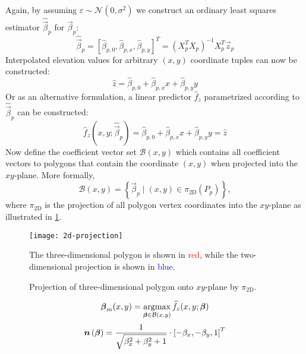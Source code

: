 %
Again, by assuming $\varepsilon \sim \mathcal{N}(0, \sigma^2)$ we construct an ordinary least squares estimator $\widehat{\vec{\beta}}_p $ for $\vec{\beta}_p$:
%
\begin{equation*}
  \widehat{\vec{\beta}}_p
  =
  {\left[
    \widehat{\beta}_{p,0},
    \widehat{\beta}_{p,x},
    \widehat{\beta}_{p,y}
  \right]}^T
  =
  \left( X_p^T X_p \right)^{-1} X_p^T \vec{z}_p
\end{equation*}
%
Interpolated elevation values for arbitrary $(x, y)$ coordinate tuples can now be constructed:
%
\begin{equation*}
  \widehat{z} = \widehat{\beta}_{p,0} + \widehat{\beta}_{p,x} x + \widehat{\beta}_{p,y} y
\end{equation*}
%
Or as an alternative formulation, a linear predictor $\widehat{f}_z$ parametrized according to $\widehat{\vec{\beta}}_p$ can be constructed:
%
\begin{equation*}
  \widehat{f}_z\left(x, y; \widehat{\vec{\beta}}_p\right)
  =
    \widehat{\beta}_{p,0}
    + \widehat{\beta}_{p,x} x
    + \widehat{\beta}_{p,y} y
  =
  \widehat{z}
\end{equation*}
%
Now define the coefficient vector set $\mathcal{B}(x, y)$ which contains all coefficient vectors to polygons that contain the coordinate $(x, y)$ when projected into the $xy$-plane.
More formally,
%
\begin{equation*}
  \mathcal{B}(x, y) = \left\{
    \vec{\beta}_p
    \mid
    (x, y) \in \pi_{\mathrm{2D}}(P_p)
  \right\},
\end{equation*}
%
where $\pi_{\mathrm{2D}}$ is the projection of all polygon vertex coordinates into the $xy$-plane as illustrated in \cref{fig:2d-polygon-projection}.
%
\begin{figure}
  \centering
  \texttt{[image: 2d-projection]}
  \caption{%
    Projection of three-dimensional polygon onto $xy$-plane by $\pi_{\mathrm{2D}}$.
  }{%
    The three-dimensional polygon is shown in \textcolor{red}{red}, while the two-dimensional projection is shown in \textcolor{blue}{blue}.
  }%
  \label{fig:2d-polygon-projection}
\end{figure}
%
\begin{equation*}
  \boldsymbol{\beta}_m(x, y)
  =
  \operatorname*{\arg\!\max}_{\boldsymbol{\beta} \in \mathcal{B}(x, y)}
    \widehat{f}_z(x, y; \boldsymbol{\beta})
\end{equation*}
%
\begin{equation*}
  \vec{n}\left(\vec{\beta}\right)
  =
  \frac{%
    1
  }{%
    \sqrt{\beta_x^2 + \beta_y^2 + 1}
  }
  \cdot
  {\left[
    -\beta_{x}, -\beta_{y}, 1
  \right]}^T
\end{equation*}



